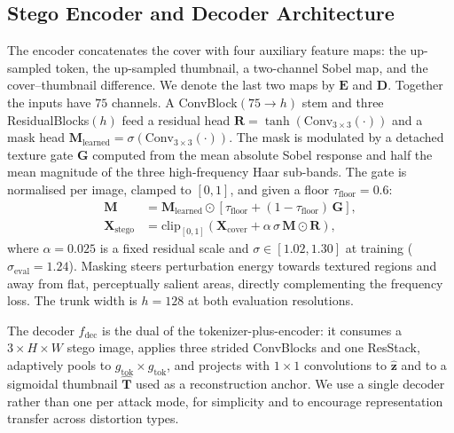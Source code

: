 \documentclass[runningheads]{llncs}
\begin{document}
\subsection{Stego Encoder and Decoder Architecture}
\label{sec:enc}
The encoder concatenates the cover with four auxiliary feature maps: the up-sampled token, the up-sampled thumbnail, a two-channel Sobel map, and the cover--thumbnail difference. We denote the last two maps by $\mathbf{E}$ and $\mathbf{D}$. Together the inputs have $75$ channels. A ConvBlock$(75\!\to\!h)$ stem and three ResidualBlocks$(h)$ feed a residual head $\mathbf{R}=\tanh(\text{Conv}_{3\times3}(\cdot))$ and a mask head $\mathbf{M}_{\text{learned}}=\sigma(\text{Conv}_{3\times3}(\cdot))$. The mask is modulated by a detached texture gate $\mathbf{G}$ computed from the mean absolute Sobel response and half the mean magnitude of the three high-frequency Haar sub-bands. The gate is normalised per image, clamped to $[0,1]$, and given a floor $\tau_{\text{floor}}=0.6$:
\begin{align}
    \mathbf{M} &= \mathbf{M}_{\text{learned}} \odot \left[\tau_{\text{floor}} + (1-\tau_{\text{floor}})\,\mathbf{G}\right], \label{eq:mask}\\
    \mathbf{X}_{\text{stego}} &= \mathrm{clip}_{[0,1]}\!\left(\mathbf{X}_{\text{cover}}+\alpha\,\sigma\,\mathbf{M}\odot\mathbf{R}\right),
    \label{eq:stego}
\end{align}
where $\alpha\!=\!0.025$ is a fixed residual scale and $\sigma\!\in\![1.02,1.30]$ at training ($\sigma_{\text{eval}}\!=\!1.24$). Masking steers perturbation energy towards textured regions and away from flat, perceptually salient areas, directly complementing the frequency loss. The trunk width is $h\!=\!128$ at both evaluation resolutions.



The decoder $f_{\text{dec}}$ is the dual of the tokenizer-plus-encoder: it consumes a $3\!\times\!H\!\times\!W$ stego image, applies three strided ConvBlocks and one ResStack, adaptively pools to $g_{\text{tok}}\!\times\!g_{\text{tok}}$, and projects with $1\!\times\!1$ convolutions to $\hat{\mathbf{z}}$ and to a sigmoidal thumbnail $\hat{\mathbf{T}}$ used as a reconstruction anchor. We use a single decoder rather than one per attack mode, for simplicity and to encourage representation transfer across distortion types.
\end{document}
